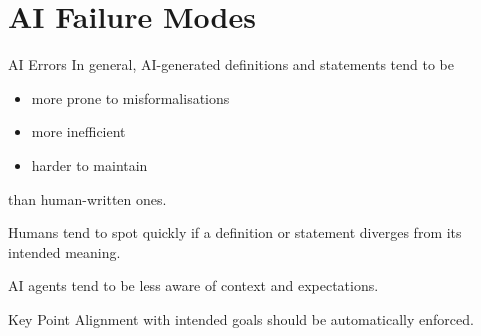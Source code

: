\documentclass{beamer}
\begin{document}
\section{AI Failure Modes}

\begin{frame}{AI Errors}
In general, AI-generated definitions and statements tend to be

\medskip

\begin{itemize}
  \item more prone to misformalisations
  \medskip
  \item more inefficient
  \medskip
  \item harder to maintain
\end{itemize}

\medskip

than human-written ones.

\bigskip

Humans tend to spot quickly if a definition or statement diverges from its intended meaning.

\bigskip

AI agents tend to be less aware of context and expectations.

\bigskip

\begin{block}{Key Point}
Alignment with intended goals should be automatically enforced.
\end{block}

\end{frame}
\end{document}
